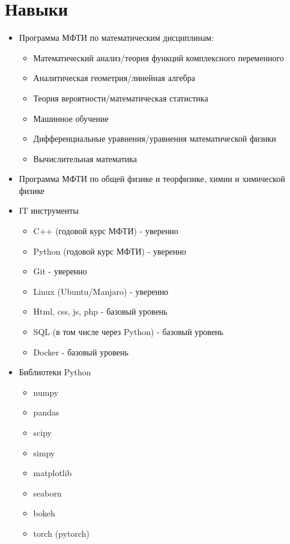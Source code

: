 \documentclass[a4paper, 12pt]{article}
\begin{document}
\section{Навыки}
\begin{itemize}
    \item Программа МФТИ по математическим дисциплинам:
    \begin{itemize}
        \item Математический анализ/теория функций комплексного переменного
        \item Аналитическая геометрия/линейная алгебра
        \item Теория вероятности/математическая статистика
        \item Машинное обучение
        \item Дифференциальные уравнения/уравнения математической физики
        \item Вычислительная математика
    \end{itemize}
    \item Программа МФТИ по общей физике и теорфизике, химии и химической физике
    \item IT инструменты
    \begin{itemize}
        \item C++ (годовой курс МФТИ)        - уверенно
        \item Python (годовой курс МФТИ)     - уверенно
        \item Git                            - уверенно
        \item Linux (Ubuntu/Manjaro)         - уверенно
        \item Html, css, js, php             - базовый уровень 
        \item SQL (в том числе через Python) - базовый уровень
        \item Docker                         - базовый уровень
    \end{itemize}
    \item Библиотеки Python
    \begin{itemize}
        \item numpy
        \item pandas
        \item scipy
        \item simpy
        \item matplotlib
        \item seaborn 
        \item bokeh
        \item torch (pytorch)

\end{itemize}
\end{itemize}
\end{document}
